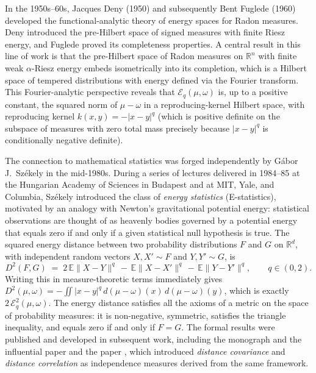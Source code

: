 \documentclass[12pt,a4paper,oneside]{amsart}
\theoremstyle{plain}
\theoremstyle{definition}
\numberwithin{equation}{section}
\numberwithin{figure}{section}
\numberwithin{table}{section}
\theoremstyle{remark}
\newcommand{\R}{\mathbb{R}}
\begin{document}
In the 1950s--60s, Jacques Deny (1950) and subsequently Bent Fuglede
(1960) developed the functional-analytic theory of energy spaces for Radon measures.
Deny introduced the pre-Hilbert space of signed measures with finite Riesz energy,
and Fuglede proved its completeness properties.
A central result in this line of work is that the pre-Hilbert space of Radon measures
on $\R^n$ with finite weak $\alpha$-Riesz energy embeds isometrically into its
completion, which is a Hilbert space of tempered distributions with energy defined via
the Fourier transform.
This Fourier-analytic perspective reveals that $\mathcal{E}_q(\mu,\omega)$ is, up to
a positive constant, the squared norm of $\mu - \omega$ in a reproducing-kernel
Hilbert space, with reproducing kernel $k(x,y) = -|x-y|^q$
(which is positive definite on the subspace of measures with zero total mass
precisely because $|x-y|^q$ is conditionally negative definite).
 
The connection to mathematical statistics was forged independently by G\'abor J.\ Sz\'ekely in the mid-1980s.
During a series of lectures delivered in 1984--85 at the Hungarian Academy of Sciences
in Budapest and at MIT, Yale, and Columbia, Sz\'ekely introduced the class of
\emph{energy statistics} (E-statistics), motivated by an analogy with Newton's
gravitational potential energy: statistical observations are thought of as heavenly bodies
governed by a potential energy that equals zero if and only if a given statistical null
hypothesis is true.
The squared energy distance between two probability distributions $F$ and $G$
on $\R^d$, with independent random vectors $X, X' \sim F$ and $Y, Y' \sim G$, is
\[
  D^2(F,G)
  \;=\;
  2\,\mathbb{E}\|X-Y\|^q
  \,-\,\mathbb{E}\|X-X'\|^q
  \,-\,\mathbb{E}\|Y-Y'\|^q,
  \qquad q\in(0,2).
\]
Writing this in measure-theoretic terms immediately gives
$D^2(\mu,\omega) = -\iint |x-y|^q\,d(\mu-\omega)(x)\,d(\mu-\omega)(y)$,
which is exactly $2\,\mathcal{E}_q^2(\mu,\omega)$.
The energy distance satisfies all the axioms of a metric on the space of probability
measures: it is non-negative, symmetric, satisfies the triangle inequality, and equals
zero if and only if $F = G$.
The formal results were published and developed in subsequent work, including the
monograph \cite{szekely2023energy} and the influential paper \cite{szekely2013energy}  and  the paper \cite{szekely2007measuring}, which introduced \emph{distance covariance} and
\emph{distance correlation} as independence measures derived from the same framework.
 
\end{document}

